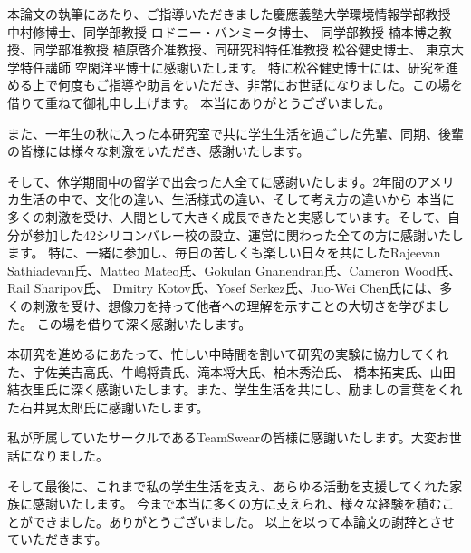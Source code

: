 \begin{acknowledgment}

  本論文の執筆にあたり、ご指導いただきました慶應義塾大学環境情報学部教授 中村修博士、同学部教授 ロドニー・バンミータ博士、
  同学部教授 楠本博之教授、同学部准教授 植原啓介准教授、同研究科特任准教授 松谷健史博士、 東京大学特任講師 空閑洋平博士に感謝いたします。
  特に松谷健史博士には、研究を進める上で何度もご指導や助言をいただき、非常にお世話になりました。この場を借りて重ねて御礼申し上げます。
  本当にありがとうございました。

  また、一年生の秋に入った本研究室で共に学生生活を過ごした先輩、同期、後輩の皆様には様々な刺激をいただき、感謝いたします。

  そして、休学期間中の留学で出会った人全てに感謝いたします。2年間のアメリカ生活の中で、文化の違い、生活様式の違い、そして考え方の違いから
  本当に多くの刺激を受け、人間として大きく成長できたと実感しています。そして、自分が参加した42シリコンバレー校の設立、運営に関わった全ての方に感謝いたします。
  特に、一緒に参加し、毎日の苦しくも楽しい日々を共にしたRajeevan Sathiadevan氏、Matteo Mateo氏、Gokulan Gnanendran氏、Cameron Wood氏、Rail Sharipov氏、
  Dmitry Kotov氏、Yosef Serkez氏、Juo-Wei Chen氏には、多くの刺激を受け、想像力を持って他者への理解を示すことの大切さを学びました。
  この場を借りて深く感謝いたします。

  本研究を進めるにあたって、忙しい中時間を割いて研究の実験に協力してくれた、宇佐美吉高氏、牛嶋将貴氏、滝本将大氏、柏木秀治氏、
  橋本拓実氏、山田結衣里氏に深く感謝いたします。また、学生生活を共にし、励ましの言葉をくれた石井晃太郎氏に感謝いたします。

  私が所属していたサークルであるTeamSwearの皆様に感謝いたします。大変お世話になりました。

  そして最後に、これまで私の学生生活を支え、あらゆる活動を支援してくれた家族に感謝いたします。
  今まで本当に多くの方に支えられ、様々な経験を積むことができました。ありがとうございました。
  以上を以って本論文の謝辞とさせていただきます。

\end{acknowledgment}
